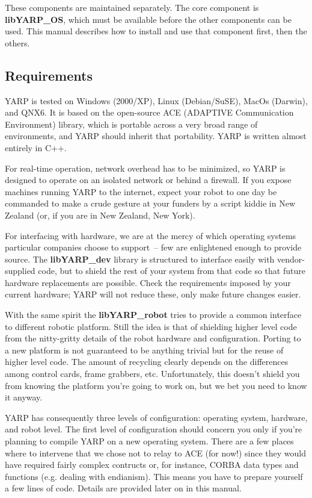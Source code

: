 These components are maintained separately.  The core component
is {\bf libYARP\_OS}, which must be available before the other 
components can be used.  This manual describes how to install and
use that component first, then the others.



\subsection{Requirements}

YARP is tested on Windows (2000/XP), Linux (Debian/SuSE), MacOs (Darwin), and QNX6.
It is based on the open-source ACE (ADAPTIVE Communication
Environment) library, which is portable across a very broad range of
environments, and YARP should inherit that portability. YARP is written almost 
entirely in C++.

For real-time operation, network overhead has to be minimized, so YARP
is designed to operate on an isolated network or behind a firewall.
If you expose machines running YARP to the internet, expect your robot
to one day be commanded to make a crude gesture at your funders by a
script kiddie in New Zealand (or, if you are in New Zealand, New
York).

For interfacing with hardware, we are at the mercy of which operating
systems particular companies choose to support~-- few are enlightened
enough to provide source.  The {\bf libYARP\_dev} library is structured
to interface easily with vendor-supplied code, but to shield the rest
of your system from that code so that future hardware replacements
are possible.  Check the requirements imposed by your current hardware;
YARP will not reduce these, only make future changes easier.

With the same spirit the {\bf libYARP\_robot} tries to provide a common interface to different robotic platform. Still the idea is that of shielding higher level code from the nitty-gritty details of the robot hardware and configuration. Porting to a new platform is not guaranteed to be anything trivial but for the reuse of higher level code. The amount of recycling clearly depends on the differences among control cards, frame grabbers, etc. Unfortunately, this doesn't shield you from knowing the platform you're going to work on, but we bet you need to know it anyway.


YARP has consequently three levels of configuration: operating system, hardware, and robot level. The first level of configuration should concern you only if you're planning to compile YARP on a new operating system. There are a few places where to intervene that we chose not to relay to ACE (for now!) since they would have required fairly complex contructs or, for instance, CORBA data types and functions (e.g. dealing with endianism). This means you have to prepare yourself a few lines of code. Details are provided later on in this manual.

